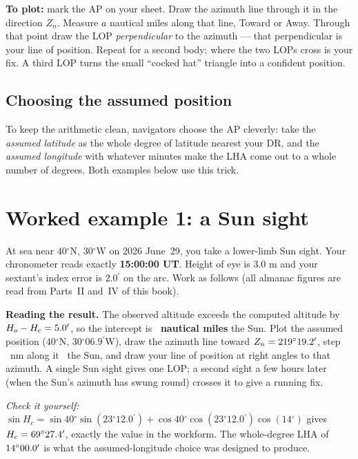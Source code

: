 \documentclass[10pt,letterpaper,twoside]{book}
\newcommand{\dg}{\ensuremath{{}^{\circ}}}
\newcommand{\pr}{\ensuremath{{}^{\prime}}}
\begin{document}
\textbf{To plot:} mark the AP on your sheet. Draw the azimuth line through it in
the direction $Z_n$. Measure $a$ nautical miles along that line, Toward or Away.
Through that point draw the LOP \emph{perpendicular} to the azimuth --- that
perpendicular is your line of position. Repeat for a second body; where the two
LOPs cross is your fix. A third LOP turns the small ``cocked hat'' triangle into a
confident position.

\section{Choosing the assumed position}
To keep the arithmetic clean, navigators choose the AP cleverly: take the
\emph{assumed latitude} as the whole degree of latitude nearest your DR, and the
\emph{assumed longitude} with whatever minutes make the LHA come out to a whole
number of degrees. Both examples below use this trick.

\chapter{Worked example 1: a Sun sight}
\label{ch:ex1}

At sea near $40\dg$N, $30\dg$W on 2026 June~29, you take a lower-limb Sun sight.
Your chronometer reads exactly \textbf{15:00:00 UT}. Height of eye is $3.0$ m and
your sextant's index error is $2.0\pr$ on the arc. Work as follows (all almanac
figures are read from Parts~II and~IV of this book).

\begin{center}\end{center}

\noindent\textbf{Reading the result.} The observed altitude exceeds the computed
altitude by $H_o-H_c=\exOneInt\pr$, so the intercept is \textbf{\exOneInt\ nautical
miles \exOneDir} the Sun. Plot the assumed position ($40\dg$N, $30\dg06.9\pr$W),
draw the azimuth line toward $Z_n=\exOneZn$, step \exOneInt~nm along it \exOneDir\
the Sun, and draw your line of position at right angles to that azimuth. A single
Sun sight gives one LOP; a second sight a few hours later (when the Sun's azimuth
has swung round) crosses it to give a running fix.

\emph{Check it yourself:} $\sin H_c = \sin40\dg\sin(23\dg12.0\pr) +
\cos40\dg\cos(23\dg12.0\pr)\cos(14\dg)$ gives $H_c=\exOneHc$, exactly the value in
the workform. The whole-degree LHA of $\exOneLHA$ is what the assumed-longitude
choice was designed to produce.
\end{document}
